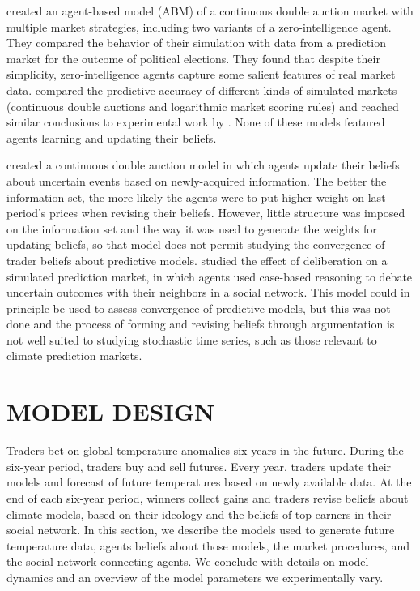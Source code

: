 \documentclass{wscpaperproc}\usepackage[]{graphicx}\usepackage[]{color}
\begin{document}
 created an agent-based model (ABM) of a continuous double auction market with multiple market strategies, including two variants of a zero-intelligence agent. They compared the behavior of their simulation with data from a prediction market for the outcome of political elections. They found that despite their simplicity, zero-intelligence agents capture some salient features of real market data.  compared the predictive accuracy of different kinds of simulated markets (continuous double auctions and logarithmic market scoring rules) and reached similar conclusions to experimental work by . None of these models featured agents learning and updating their beliefs.

 created a continuous double auction model in which agents update their beliefs about uncertain events based on newly-acquired information. The better the information set, the more likely the agents were to put higher weight on last period's prices when revising their beliefs. However, little structure was imposed on the information set and the way it was used to generate the weights for updating beliefs, so that model does not permit studying the convergence of trader beliefs about predictive models.  studied the effect of deliberation on a simulated prediction market, in which agents used case-based reasoning  to debate uncertain outcomes with their neighbors in a social network. This model could in principle be used to assess convergence of predictive models, but this was not done and the process of forming and revising beliefs through argumentation is not well suited to studying stochastic time series, such as those relevant to climate prediction markets.

\section{MODEL DESIGN}

Traders bet on global temperature anomalies six years in the future. 
During the six-year period, traders buy and sell futures. 
Every year, traders update their models and forecast of future temperatures based on newly available data. 
At the end of each six-year period, winners collect gains and traders revise beliefs about climate models, based on their ideology and the beliefs of top earners in their social network. 
In this section, we describe the models used to generate future temperature data, agents beliefs about those models, the market procedures, and the social network connecting agents. 
We conclude with details on model dynamics and an overview of the model parameters we experimentally vary.
\end{document}
